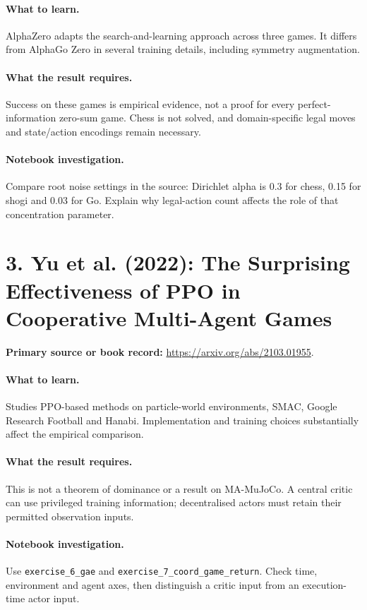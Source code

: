 \documentclass[11pt]{scrartcl}
\begin{document}
\paragraph{What to learn.} AlphaZero adapts the search-and-learning approach across three games. It differs from AlphaGo Zero in several training details, including symmetry augmentation.

\paragraph{What the result requires.} Success on these games is empirical evidence, not a proof for every perfect-information zero-sum game. Chess is not solved, and domain-specific legal moves and state/action encodings remain necessary.

\paragraph{Notebook investigation.} Compare root noise settings in the source: Dirichlet alpha is 0.3 for chess, 0.15 for shogi and 0.03 for Go. Explain why legal-action count affects the role of that concentration parameter.

\section*{3. Yu et al. (2022): The Surprising Effectiveness of PPO in Cooperative Multi-Agent Games}
\textbf{Primary source or book record:} \url{https://arxiv.org/abs/2103.01955}.

\paragraph{What to learn.} Studies PPO-based methods on particle-world environments, SMAC, Google Research Football and Hanabi. Implementation and training choices substantially affect the empirical comparison.

\paragraph{What the result requires.} This is not a theorem of dominance or a result on MA-MuJoCo. A central critic can use privileged training information; decentralised actors must retain their permitted observation inputs.

\paragraph{Notebook investigation.} Use \texttt{exercise\_6\_gae} and \texttt{exercise\_7\_coord\_game\_return}. Check time, environment and agent axes, then distinguish a critic input from an execution-time actor input.
\end{document}
